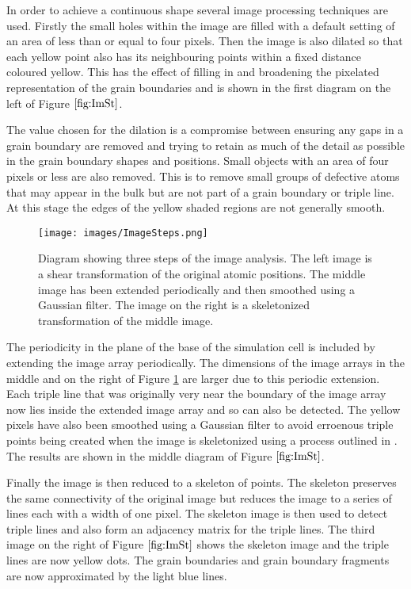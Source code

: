 \documentclass[12pt,a4paper,openany]{report}
\begin{document}
In order to achieve a continuous shape several image processing techniques are used. Firstly the small holes within the image are filled with a default setting of an area of less than or equal to four pixels. Then the image is also dilated so that each yellow point also has its neighbouring points within a fixed distance coloured yellow. This has the effect of filling in and broadening the pixelated representation of the grain boundaries and is shown in the first diagram on the left of Figure $\ref{fig:ImSt}$. 

The value chosen for the dilation is a compromise between ensuring any gaps in a grain boundary are removed and trying to retain as much of the detail as possible in the grain boundary shapes and positions. Small objects with an area of four pixels or less are also removed. This is to remove small groups of defective atoms that may appear in the bulk but are not part of a grain boundary or triple line. At this stage the edges of the yellow shaded regions are not generally smooth.

 
\begin{figure}[H]
	\centering
	\texttt{[image: images/ImageSteps.png]} 
	\caption{Diagram showing three steps of the image analysis. The left image is a shear transformation of the original atomic positions. The middle image has been extended periodically and then smoothed using a Gaussian filter. The image on the right is a skeletonized transformation of the middle image.}  
	\label{fig:ImSt}
\end{figure}


The periodicity in the plane of the base of the simulation cell is included by extending the image array periodically. The dimensions of the image arrays in the middle and on the right of Figure \ref{fig:ImSt} are larger due to this periodic extension. Each triple line that was originally very near the boundary of the image array now lies inside the extended image array and so can also be detected. The yellow pixels have also been smoothed using a Gaussian filter to avoid erroenous triple points being created when the image is skeletonized using a process outlined in \cite{ZHANG1997,Abu-Ain2013}. The results are shown in the middle diagram of Figure $\ref{fig:ImSt}$.  

Finally the image is then reduced to a skeleton of points. The skeleton preserves the same connectivity of the original image but reduces the image to a series of lines each with a width of one pixel. The skeleton image is then used to detect triple lines and also form an adjacency matrix for the triple lines. The third image on the right of Figure $\ref{fig:ImSt}$ shows the skeleton image and the triple lines are now yellow dots. The grain boundaries and grain boundary fragments are now approximated by the light blue lines.
\end{document}
